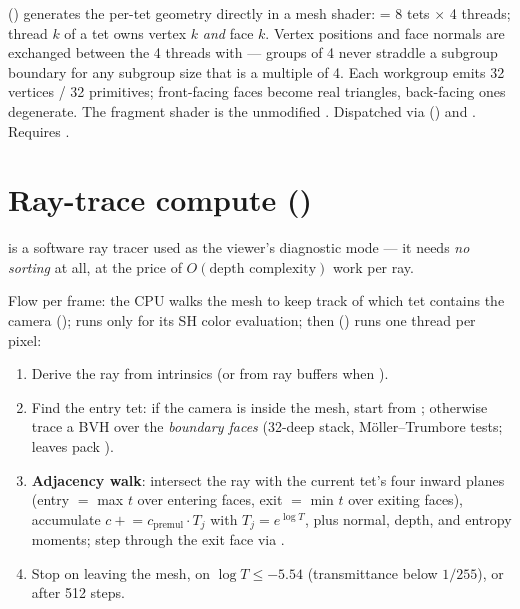  () generates the
per-tet geometry directly in a mesh shader:  = 8
tets $\times$ 4 threads; thread $k$ of a tet owns vertex $k$ \emph{and} face
$k$. Vertex positions and face normals are exchanged between the 4 threads
with  --- groups of 4 never straddle a subgroup
boundary for any subgroup size that is a multiple of 4. Each workgroup emits
32 vertices / 32 primitives; front-facing faces become real triangles,
back-facing ones degenerate. The fragment shader is the unmodified
. Dispatched via 
() and . Requires
.

\section{Ray-trace compute ()}

 is a software ray tracer used as the viewer's
diagnostic mode --- it needs \emph{no sorting} at all, at the price of
$O(\text{depth complexity})$ work per ray.

Flow per frame: the CPU walks the mesh to keep track of which tet contains
the camera ();  runs
only for its SH color evaluation; then 
() runs one thread per pixel:

\begin{enumerate}
\item Derive the ray from intrinsics (or from ray buffers when
  ).
\item Find the entry tet: if the camera is inside the mesh, start from
  ; otherwise trace a BVH over the \emph{boundary faces}
  (32-deep stack, M\"oller--Trumbore tests; leaves pack
  ).
\item \textbf{Adjacency walk}: intersect the ray with the current tet's four
  inward planes (entry $=$ max $t$ over entering faces, exit $=$ min $t$
  over exiting faces), accumulate
  $c \mathrel{+}= c_{\text{premul}} \cdot T_j$ with
  $T_j = e^{\log T}$, plus normal, depth, and entropy moments; step through
  the exit face via .
\item Stop on leaving the mesh, on
  $\log T \le -5.54$ (transmittance below $1/255$), or after 512 steps.
\end{enumerate}

